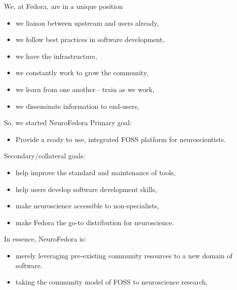 \begin{frame}[c]{We, at Fedora, are in a unique position}
  \begin{itemize}
    \item we \alert{liaison between upstream and users} already,
      \pause{}
    \item we \alert{follow best practices} in software development,
      \pause{}
    \item we have the \alert{infrastructure},
      \pause{}
    \item we constantly \alert{work to grow the community},
      \pause{}
    \item we \alert{learn from one another}---train as we work,
      \pause{}
    \item we \alert{disseminate} information to end-users,
  \end{itemize}
\end{frame}
\begin{frame}[c]{So, we started NeuroFedora}
  \textcolor{FedoraBlue}{Primary goal:}
  \begin{itemize}
    \item Provide a \alert{ready to use, integrated FOSS platform} for neuroscientists\footnotemark[7].
  \end{itemize}
  \pause{}
  \textcolor{FirstGreen}{Secondary/collateral goals:}
  \pause{}
  \begin{itemize}
    \item help \alert{improve the standard and maintenance} of tools,
    \item help users \alert{develop software development skills},
    \item \alert{make neuroscience accessible} to non-specialists,
      \pause{}
    \item \textcolor{FriendsMagenta}{make Fedora the go-to distribution for neuroscience}.
  \end{itemize}
\end{frame}
\begin{frame}[c]{In essence,}
  \textcolor{FedoraBlue}{NeuroFedora is:\\}
  \begin{itemize}
    \item \textcolor{FriendsMagenta}{merely leveraging pre-existing community resources to a new domain of software.}\\
      \pause{}
    \item \textcolor{FeaturesOrange}{taking the community model of FOSS to neuroscience research,}
  \end{itemize}
\end{frame}
